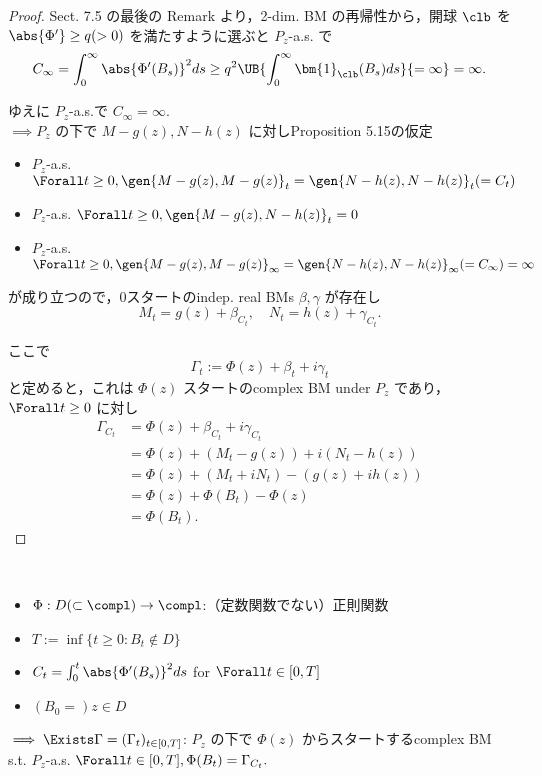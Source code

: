 \documentclass{jsarticle}
\begin{document}
\begin{proof}
    Sect. 7.5 の最後の Remark より，2-dim. BM の再帰性から，開球 $\clb$ を $\abs{\Phi'}\ge q (>0)$ を満たすように選ぶと $P_z$-a.s. で
    $$
    C_\infty
    = \int_0^\infty\abs{\Phi'(B_s)}^2ds
    \ge q^2\UB{\int_0^\infty\bm{1}_{\clb}(B_s)ds}{=\infty}
    = \infty.
    $$
    
    ゆえに $P_z$-a.s.で $C_\infty=\infty.$ \\
    $\implies P_z$ の下で $M-g(z), N-h(z)$ に対しProposition 5.15の仮定
    \begin{itemize}
        \item 
        $P_z$-a.s. $\Forall t\ge0, \gen{M-g(z), M-g(z)}_t=\gen{N-h(z), N-h(z)}_t(=C_t)$
        \item 
        $P_z$-a.s. $\Forall t\ge0, \gen{M-g(z), N-h(z)}_t=0$
        \item 
        $P_z$-a.s. $\Forall t\ge0, \gen{M-g(z), M-g(z)}_{\infty}=\gen{N-h(z), N-h(z)}_{\infty}(=C_\infty)=\infty$
    \end{itemize}
    が成り立つので，0スタートのindep. real BMs $\beta, \gamma$ が存在し
    $$
    M_t=g(z)+\beta_{C_t},\quad
    N_t=h(z)+\gamma_{C_t}.
    $$

    ここで
    $$
    \Gamma_t
    := \Phi(z)+\beta_t+i\gamma_t
    $$
    と定めると，これは $\Phi(z)$ スタートのcomplex BM under $P_z$ であり，$\Forall t\ge0$ に対し
    \begin{align}
        \Gamma_{C_t}
        &= \Phi(z)+\beta_{C_t}+i\gamma_{C_t} \\
        &= \Phi(z)+(M_t-g(z))+i(N_t-h(z)) \\
        &= \Phi(z)+(M_t+iN_t)-(g(z)+ih(z)) \\
        &= \Phi(z)+\Phi(B_t)-\Phi(z) \\
        &= \Phi(B_t).
    \end{align}
\end{proof}

\begin{screen}
    \begin{thm*}~
        \begin{itemize}
            \item 
            $\Phi:D(\subset \compl)\to\compl$:（定数関数でない）正則関数
            \item 
            $T:=\inf\{t\ge0:B_t\notin D\}$
            \item 
            $C_t=\int_0^t\abs{\Phi'(B_s)}^2ds$ for $\Forall t\in [0, T]$
            \item 
            $(B_0=)z\in D$
        \end{itemize}
        $\implies \Exists \Gamma=(\Gamma_t)_{t\in [0, T]}$: $P_z$ の下で $\Phi(z)$ からスタートするcomplex BM s.t. $P_z$-a.s. $\Forall t\in [0, T], \Phi(B_t)=\Gamma_{C_t}.$
    \end{thm*}
\end{screen}
\end{document}
